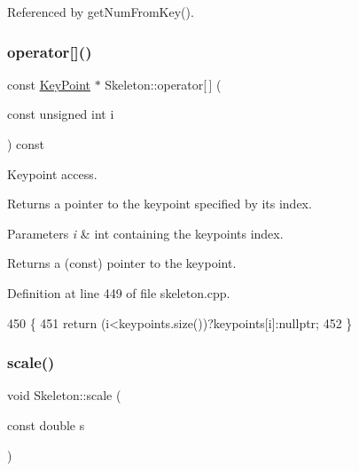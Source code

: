 Referenced by get\+Num\+From\+Key().

\mbox{\label{classassistive__rehab_1_1Skeleton_a0692ab89f16b0914b9ca9e0d4a07e52c}} 
\subsubsection{\texorpdfstring{operator[]()}{operator[]()}\hspace{0.1cm}{\footnotesize\ttfamily [2/2]}}
{\footnotesize\ttfamily const \hyperlink{classassistive__rehab_1_1KeyPoint}{Key\+Point} $\ast$ Skeleton\+::operator\mbox{[}$\,$\mbox{]} (\begin{DoxyParamCaption}\item[{const unsigned int}]{i }\end{DoxyParamCaption}) const}



Keypoint access. 

Returns a pointer to the keypoint specified by its index. 
\begin{DoxyParams}{Parameters}
{\em i} & int containing the keypoint\textquotesingle{}s index. \\
\hline
\end{DoxyParams}
\begin{DoxyReturn}{Returns}
a (const) pointer to the keypoint. 
\end{DoxyReturn}


Definition at line 449 of file skeleton.\+cpp.


\begin{DoxyCode}
450 \{
451     \textcolor{keywordflow}{return} (i<keypoints.size())?keypoints[i]:\textcolor{keyword}{nullptr};
452 \}
\end{DoxyCode}
\mbox{\label{classassistive__rehab_1_1Skeleton_a21fded128e2240e4dd507030b7386670}} 
\subsubsection{\texorpdfstring{scale()}{scale()}}
{\footnotesize\ttfamily void Skeleton\+::scale (\begin{DoxyParamCaption}\item[{const double}]{s }\end{DoxyParamCaption})}




